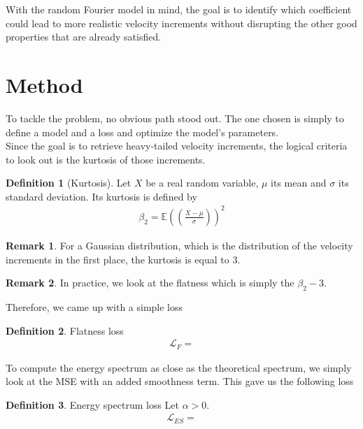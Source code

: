 \documentclass[a4paper,12pt]{article}
\theoremstyle{definition}
\newtheorem{definition}{Definition}
\newtheorem{remark}{Remark}
\begin{document}
\bigskip
With the random Fourier model in mind, the goal is to identify which coefficient could lead to more realistic velocity increments without disrupting the other good properties that are already satisfied. 


\section{Method}
To tackle the problem, no obvious path stood out. 
The one chosen is simply to define a model and a loss and optimize the model's parameters. \\
Since the goal is to retrieve heavy-tailed velocity increments, the logical criteria to look out is the kurtosis of those increments. 


\begin{definition}[Kurtosis]
    Let $X$ be a real random variable, $\mu$ its mean and $\sigma$ its standard deviation. Its kurtosis is defined by 
    \begin{align}
    \beta_2=\mathbb{E}\left((\frac{X-\mu}{\sigma}) \right)^2    
    \end{align}
     
\end{definition}

\begin{remark}
    For a Gaussian distribution, which is the distribution of the velocity increments in the first place, the kurtosis is equal to 3.
\end{remark}

\begin{remark}
    In practice, we look at the flatness which is simply the $\beta_2-3$.
\end{remark}
Therefore, we came up with a simple loss 

\begin{definition}{Flatness loss}
    \begin{align}
        \mathcal{L}_F = 
    \end{align}
\end{definition}

To compute the energy spectrum as close as the theoretical spectrum, we simply look at the MSE with an added smoothness term. This gave us the following loss

\begin{definition} Energy spectrum loss
    Let $\alpha>0$. 
    \begin{align}
        \mathcal{L}_{ES} = 
    \end{align} 
\end{definition}
\end{document}
